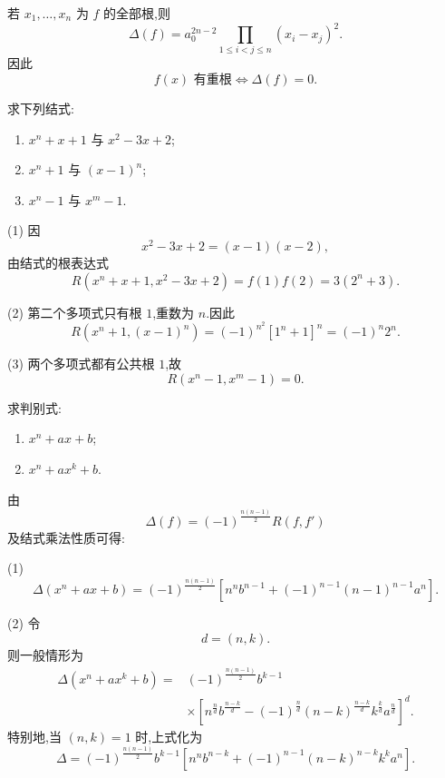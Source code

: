 \begin{theorem}[\markstar]
若 $x_1,\ldots,x_n$ 为 $f$ 的全部根,则
\[
  \Delta(f)
  =a_0^{2n-2}
  \prod\limits_{1\le i<j\le n}(x_i-x_j)^2.
\]
因此
\[
  f(x)\text{ 有重根}
  \iff
  \Delta(f)=0.
\]
\end{theorem}

\begin{example}
求下列结式:
\begin{enumerate}
  \item $x^n+x+1$ 与 $x^2-3x+2$;
  \item $x^n+1$ 与 $(x-1)^n$;
  \item $x^n-1$ 与 $x^m-1$.
\end{enumerate}
\end{example}
\exampleblank

\begin{solution}

(1) 因
\[
  x^2-3x+2=(x-1)(x-2),
\]
由结式的根表达式
\[
  R(x^n+x+1,x^2-3x+2)
  =f(1)f(2)
  =3(2^n+3).
\]

(2) 第二个多项式只有根 $1$,重数为 $n$.因此
\[
  R(x^n+1,(x-1)^n)
  =(-1)^{n^2}[1^n+1]^n
  =(-1)^n2^n.
\]

(3) 两个多项式都有公共根 $1$,故
\[
  R(x^n-1,x^m-1)=0.
\]
\end{solution}

\begin{example}
求判别式:
\begin{enumerate}
  \item $x^n+ax+b$;
  \item $x^n+ax^k+b$.
\end{enumerate}
\end{example}
\exampleblank

\begin{solution}
由
\[
  \Delta(f)=(-1)^{\frac{n(n-1)}2}R(f,f')
\]
及结式乘法性质可得:

(1)
\[
\boxed{
  \Delta(x^n+ax+b)
  =(-1)^{\frac{n(n-1)}2}
  \left[n^n b^{n-1}
  +(-1)^{n-1}(n-1)^{n-1}a^n\right].}
\]

(2) 令
\[
  d=(n,k).
\]
则一般情形为
\[
\boxed{
\begin{aligned}
  \Delta(x^n+ax^k+b)
  ={}&(-1)^{\frac{n(n-1)}2}b^{k-1}\\
  &\times\left[
    n^{\frac{n}{d}}b^{\frac{n-k}{d}}
    -(-1)^{\frac{n}{d}}
    (n-k)^{\frac{n-k}{d}}k^{\frac{k}{d}}a^{\frac{n}{d}}
  \right]^d.
\end{aligned}}
\]
特别地,当 $(n,k)=1$ 时,上式化为
\[
  \Delta
  =(-1)^{\frac{n(n-1)}2}b^{k-1}
  \left[n^n b^{n-k}
  +(-1)^{n-1}(n-k)^{n-k}k^k a^n\right].
\]
\end{solution}

